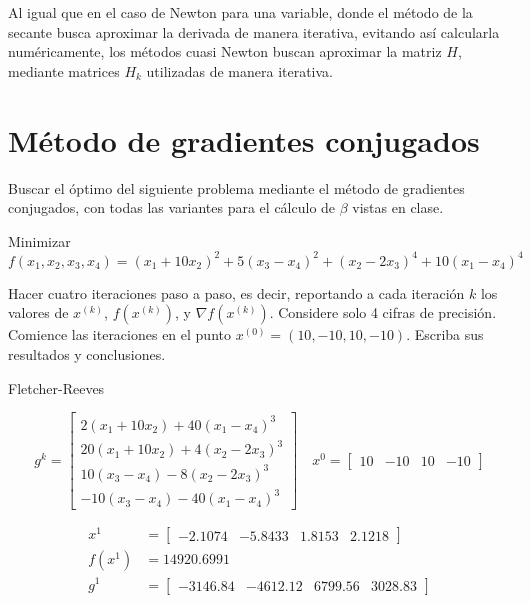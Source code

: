 \documentclass[12pt]{article}
\begin{document}
\begin{enumerate}
    Al igual que en el caso de Newton para una variable, donde el método de la secante busca aproximar la derivada de manera iterativa, evitando así calcularla numéricamente, los métodos cuasi Newton buscan aproximar la matriz $H$, mediante matrices $H_k$ utilizadas de manera iterativa.
\end{enumerate}

\section*{Método de gradientes conjugados}

Buscar el óptimo del siguiente problema mediante el método de gradientes conjugados, con todas las variantes para el cálculo de $\beta$ vistas en clase.

Minimizar \[f(x_1,x_2,x_3,x_4) = (x_1+10x_2)^2+5(x_3-x_4)^2+(x_2-2x_3)^4+10(x_1-x_4)^4\]

Hacer cuatro iteraciones paso a paso, es decir, reportando a cada iteración $k$ los valores de $x^{(k)}$, $f(x^{(k)})$, y $\nabla f(x^{(k)})$. Considere solo 4 cifras de precisión. Comience las iteraciones en el punto $x^{(0)} = (10,-10,10,-10)$. Escriba sus resultados y conclusiones.

Fletcher-Reeves

\[g^k = \begin{bmatrix}
    2(x_1+10x_2) + 40(x_1-x_4)^3 \\
    20(x_1+10x_2) + 4(x_2-2x_3)^3 \\
    10(x_3-x_4) - 8(x_2-2x_3)^3 \\
    -10(x_3-x_4)-40(x_1-x_4)^3
\end{bmatrix} \quad x^0 = \begin{bmatrix}
    10 &-10 & 10 & -10
\end{bmatrix}\]


\begin{align*}
    x^1 &= \begin{bmatrix}
        -2.1074 & -5.8433 & 1.8153 & 2.1218
    \end{bmatrix} \\
    f(x^1) &= 14920.6991 \\
    g^1 &= \begin{bmatrix}
        -3146.84 & -4612.12 & 6799.56 & 3028.83
    \end{bmatrix}
\end{align*}

\end{document}
